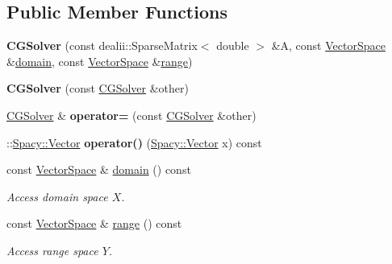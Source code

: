 \subsection*{\-Public \-Member \-Functions}
\begin{DoxyCompactItemize}
\item 
\hypertarget{classSpacy_1_1dealII_1_1CGSolver_a554c4be5bf37a28fdeaef272e07947ba}{{\bfseries \-C\-G\-Solver} (const dealii\-::\-Sparse\-Matrix$<$ double $>$ \&\-A, const \hyperlink{classSpacy_1_1VectorSpace}{\-Vector\-Space} \&\hyperlink{classSpacy_1_1OperatorBase_a2588f9b3e0188820c4c494e63293dc6f}{domain}, const \hyperlink{classSpacy_1_1VectorSpace}{\-Vector\-Space} \&\hyperlink{classSpacy_1_1OperatorBase_ab19d3b7a6f290b1079248f1e567e53d6}{range})}\label{classSpacy_1_1dealII_1_1CGSolver_a554c4be5bf37a28fdeaef272e07947ba}

\item 
\hypertarget{classSpacy_1_1dealII_1_1CGSolver_ad9b75390b2b2deeda4e2372c48739ba1}{{\bfseries \-C\-G\-Solver} (const \hyperlink{classSpacy_1_1dealII_1_1CGSolver}{\-C\-G\-Solver} \&other)}\label{classSpacy_1_1dealII_1_1CGSolver_ad9b75390b2b2deeda4e2372c48739ba1}

\item 
\hypertarget{classSpacy_1_1dealII_1_1CGSolver_ad66678932354cb523292c90bb9148464}{\hyperlink{classSpacy_1_1dealII_1_1CGSolver}{\-C\-G\-Solver} \& {\bfseries operator=} (const \hyperlink{classSpacy_1_1dealII_1_1CGSolver}{\-C\-G\-Solver} \&other)}\label{classSpacy_1_1dealII_1_1CGSolver_ad66678932354cb523292c90bb9148464}

\item 
\hypertarget{classSpacy_1_1dealII_1_1CGSolver_ae36d85194fbd49f5658eccfada2c3214}{\-::\hyperlink{classSpacy_1_1Vector}{\-Spacy\-::\-Vector} {\bfseries operator()} (\hyperlink{classSpacy_1_1Vector}{\-Spacy\-::\-Vector} x) const }\label{classSpacy_1_1dealII_1_1CGSolver_ae36d85194fbd49f5658eccfada2c3214}

\item 
\hypertarget{classSpacy_1_1OperatorBase_a2588f9b3e0188820c4c494e63293dc6f}{const \hyperlink{classSpacy_1_1VectorSpace}{\-Vector\-Space} \& \hyperlink{classSpacy_1_1OperatorBase_a2588f9b3e0188820c4c494e63293dc6f}{domain} () const }\label{classSpacy_1_1OperatorBase_a2588f9b3e0188820c4c494e63293dc6f}

\begin{DoxyCompactList}\small\item\em \-Access domain space $X$. \end{DoxyCompactList}\item 
\hypertarget{classSpacy_1_1OperatorBase_ab19d3b7a6f290b1079248f1e567e53d6}{const \hyperlink{classSpacy_1_1VectorSpace}{\-Vector\-Space} \& \hyperlink{classSpacy_1_1OperatorBase_ab19d3b7a6f290b1079248f1e567e53d6}{range} () const }\label{classSpacy_1_1OperatorBase_ab19d3b7a6f290b1079248f1e567e53d6}

\begin{DoxyCompactList}\small\item\em \-Access range space $Y$. \end{DoxyCompactList}\end{DoxyCompactItemize}
